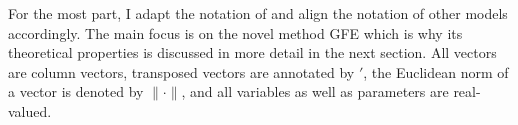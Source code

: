 For the most part, I adapt the notation of \textcite{bonhomme2015grouped} and align the notation of other models accordingly. The main focus is on the novel method GFE which is why its theoretical properties is discussed in more detail in the next section. %
All vectors are column vectors, transposed vectors are annotated by $'$, the Euclidean norm of a vector is denoted by $\lVert \cdot \rVert $, and all variables as well as parameters are real-valued.

